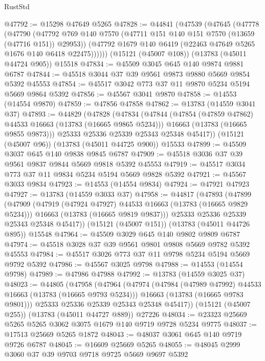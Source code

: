 \begin{lexlean}{RustStd}
\begin{coremodule}
@47792 := @15298 @47649 @5265
@47828 := @44841
    (@47539
      (@47645
        (@47778
          (@47790
            (@47792 @769 @140 @7570 (@47711 @151 @140 @151 @7570 (@13659 (@47716 @151)) @29953))
            (@47792 @1679 @140 @6419 (@22463 @47649 @5265 @1676 @140 @6418 @22475))))))
    (@15121 (@45007 @108))
    (@13783 (@45011 @44724 @905))
    @15518
@47834 := @45509 @3045 @645 @140 @9874 @9881 @6787
@47844 := @45518 @3044 @37 @39 @9561 @9873 @9880 @5669 @9854 @5392 @45553
@47854 := @45517 @3042 @773 @37 @11 @9870 @5234 @5194 @5669 @9864 @5392
@47856 := @45567 @3041 @9870
@47858 := @14553 (@14554 @9870)
@47859 := @47856 @47858
@47862 := @13783 (@14559 @3041 @37)
@47893 := @44829
    (@47828
      (@47834
        (@47844
          (@47854 (@47859 @47862) @44533 @16663 (@13783 (@16665 @9865 @5234)))
          @16663
          (@13783 (@16665 @9855 @9873)))
        @25333
        @25336
        @25339
        @25343
        @25348
        @45417))
    (@15121 (@45007 @96))
    (@13783 (@45011 @44725 @900))
    @15533
@47899 := @45509 @3037 @645 @140 @9838 @9845 @6787
@47909 := @45518 @3036 @37 @39 @9561 @9837 @9844 @5669 @9818 @5392 @45553
@47919 := @45517 @3034 @773 @37 @11 @9834 @5234 @5194 @5669 @9828 @5392
@47921 := @45567 @3033 @9834
@47923 := @14553 (@14554 @9834)
@47924 := @47921 @47923
@47927 := @13783 (@14559 @3033 @37)
@47958 := @44817
    (@47893
      (@47899
        (@47909
          (@47919 (@47924 @47927) @44533 @16663 (@13783 (@16665 @9829 @5234)))
          @16663
          (@13783 (@16665 @9819 @9837)))
        @25333
        @25336
        @25339
        @25343
        @25348
        @45417))
    (@15121 (@45007 @151))
    (@13783 (@45011 @44726 @895))
    @15548
@47964 := @45509 @3029 @645 @140 @9802 @9809 @6787
@47974 := @45518 @3028 @37 @39 @9561 @9801 @9808 @5669 @9782 @5392 @45553
@47984 := @45517 @3026 @773 @37 @11 @9798 @5234 @5194 @5669 @9792 @5392
@47986 := @45567 @3025 @9798
@47988 := @14553 (@14554 @9798)
@47989 := @47986 @47988
@47992 := @13783 (@14559 @3025 @37)
@48023 := @44805
    (@47958
      (@47964
        (@47974
          (@47984 (@47989 @47992) @44533 @16663 (@13783 (@16665 @9793 @5234)))
          @16663
          (@13783 (@16665 @9783 @9801)))
        @25333
        @25336
        @25339
        @25343
        @25348
        @45417))
    (@15121 (@45007 @255))
    (@13783 (@45011 @44727 @889))
    @27226
@48034 := @23323 @25669 @5265 @5265 @3062 @3075 @1679 @140 @9719 @9728 @5234 @9775
@48037 := @17513 @25669 @5265 @1872
@48043 := @48037 @3061 @645 @140 @9719 @9726 @6787
@48045 := @16609 @25669 @5265
@48055 := @48045 @2999 @3060 @37 @39 @9703 @9718 @9725 @5669 @9697 @5392

\end{coremodule}
\end{lexlean}
